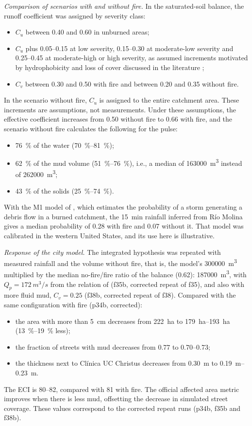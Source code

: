 \emph{Comparison of scenarios with and without fire.} In the saturated-soil balance, the runoff coefficient was assigned by severity class:
\begin{itemize}
\item $C_u$ between 0.40 and 0.60 in unburned areas;
\item $C_u$ plus 0.05--0.15 at low severity, 0.15--0.30 at moderate-low severity and 0.25--0.45 at moderate-high or high severity, as assumed increments motivated by hydrophobicity and loss of cover discussed in the literature \citep{moody2013};
\item $C_v$ between 0.30 and 0.50 with fire and between 0.20 and 0.35 without fire.
\end{itemize}
In the scenario without fire, $C_u$ is assigned to the entire catchment area. These increments are assumptions, not measurements. Under these assumptions, the effective coefficient increases from 0.50 without fire to 0.66 with fire, and the scenario without fire calculates the following for the pulse:
\begin{itemize}
\item \SI{76}{\percent} of the water (\SIrange{70}{81}{\percent});
\item \SI{62}{\percent} of the mud volume (\SIrange{51}{76}{\percent}), i.e., a median of \SI{163000}{m^3} instead of \SI{262000}{m^3};
\item \SI{43}{\percent} of the solids (\SIrange{25}{74}{\percent}).
\end{itemize}
With the M1 model of \citet{staley2017}, which estimates the probability of a storm generating a debris flow in a burned catchment, the \SI{15}{min} rainfall inferred from Río Molina gives a median probability of 0.28 with fire and 0.07 without it. That model was calibrated in the western United States, and its use here is illustrative.

\emph{Response of the city model.} The integrated hypothesis was repeated with measured rainfall and the volume without fire, that is, the model's \SI{300000}{m^3} multiplied by the median no-fire/fire ratio of the balance (0.62): \SI{187000}{m^3}, with $Q_p=\SI{172}{m^3/s}$ from the relation of \citet{mizuyama1992} (f35b, corrected repeat of f35), and also with more fluid mud, $C_v=0.25$ (f38b, corrected repeat of f38). Compared with the same configuration with fire (p34b, corrected):
\begin{itemize}
\item the area with more than \SI{5}{cm} decreases from \SI{222}{ha} to \SIrange{179}{193}{ha} (\SIrange{13}{19}{\percent} less);
\item the fraction of streets with mud decreases from 0.77 to 0.70--0.73;
\item the thickness next to Clínica UC Christus decreases from \SI{0.30}{m} to \SIrange{0.19}{0.23}{m}.
\end{itemize}
The ECI is 80--82, compared with 81 with fire. The official affected area metric improves when there is less mud, offsetting the decrease in simulated street coverage. These values correspond to the corrected repeat runs (p34b, f35b and f38b).

